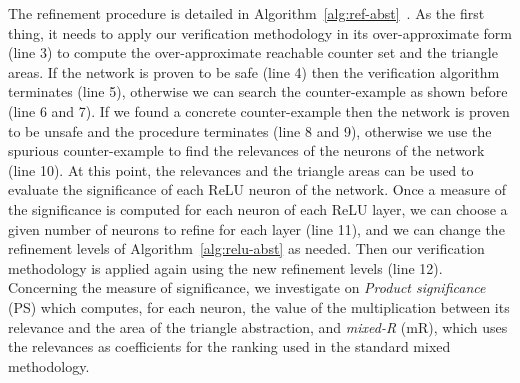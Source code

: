 The refinement procedure is detailed in Algorithm~\ref{alg:ref-abst}~\cite{DBLP:conf/cpsschool/DemarchiG22}.
As the first thing, it needs to apply our verification methodology in its
over-approximate form (line 3) to compute the over-approximate
reachable counter set and the triangle areas. If the network is proven to be safe 
(line 4) then the verification algorithm terminates (line 5), otherwise we can 
search the counter-example as shown before (line 6 and 7). 
If we found a concrete counter-example then the network is proven to be 
unsafe and the procedure terminates (line 8 and 9), otherwise we use the spurious
counter-example to find the relevances of the neurons of the network (line 10).
At this point, the relevances and the triangle areas can be used to evaluate the
significance of each ReLU neuron of the network. Once a measure of the significance 
is computed for each neuron of each ReLU layer, we can choose a given number of 
neurons to refine for each layer (line 11), and we can change the refinement levels
of Algorithm~\ref{alg:relu-abst} as needed. Then our verification methodology 
is applied again using the new refinement levels (line 12). Concerning the measure
of significance, we investigate on \emph{Product significance} (PS) which computes, 
for each neuron, the value of the multiplication between its relevance and the area
of the triangle abstraction, and \emph{mixed-R} (mR), which uses the relevances as 
coefficients for the ranking used in the standard mixed methodology.